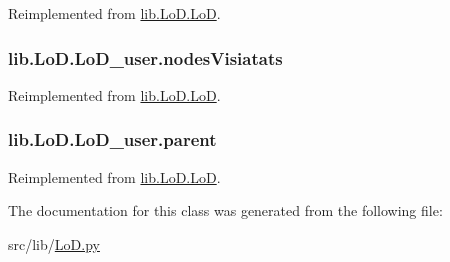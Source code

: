 Reimplemented from \hyperlink{classlib_1_1_lo_d_1_1_lo_d_a9d7425cf14f1f5b52625b8b6e924214e}{lib.\-Lo\-D.\-Lo\-D}.

\hypertarget{classlib_1_1_lo_d_1_1_lo_d__user_a7de3b2dcf364d63f808f39b9154c4a30}{
\subsubsection[{nodes\-Visiatats}]{\setlength{\rightskip}{0pt plus 5cm}lib.\-Lo\-D.\-Lo\-D\-\_\-user.\-nodes\-Visiatats}}\label{classlib_1_1_lo_d_1_1_lo_d__user_a7de3b2dcf364d63f808f39b9154c4a30}


Reimplemented from \hyperlink{classlib_1_1_lo_d_1_1_lo_d_ae9ac9b8c5a1b8c66518f1681bff48078}{lib.\-Lo\-D.\-Lo\-D}.

\hypertarget{classlib_1_1_lo_d_1_1_lo_d__user_a71fae9e48d7b735bce5ed983c79bdfe5}{
\subsubsection[{parent}]{\setlength{\rightskip}{0pt plus 5cm}lib.\-Lo\-D.\-Lo\-D\-\_\-user.\-parent}}\label{classlib_1_1_lo_d_1_1_lo_d__user_a71fae9e48d7b735bce5ed983c79bdfe5}


Reimplemented from \hyperlink{classlib_1_1_lo_d_1_1_lo_d_a19c56f06f44d2285fbfc8fa6e69bff6b}{lib.\-Lo\-D.\-Lo\-D}.



The documentation for this class was generated from the following file\-:\begin{DoxyCompactItemize}
\item 
src/lib/\hyperlink{_lo_d_8py}{Lo\-D.\-py}\end{DoxyCompactItemize}
